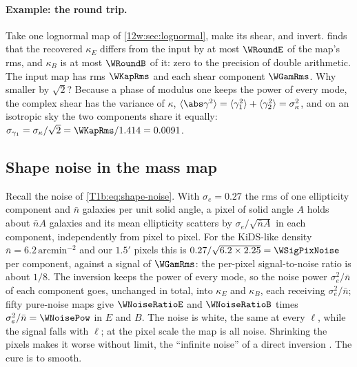 \paragraph{Example: the round trip.} Take one lognormal map of \cref{12w:sec:lognormal}, make its shear, and
invert.  finds that the recovered $\kappa_E$ differs from the input by at most $\WRoundE$ of the
map's rms, and $\kappa_B$ is at most $\WRoundB$ of it: zero to the precision of double arithmetic. The input map has
rms $\WKapRms$ and each shear component $\WGamRms$. Why smaller by $\sqrt2$? Because a phase of modulus one keeps
the power of every mode, the complex shear has the variance of $\kappa$, $\langle\abs\gamma^2\rangle=\langle
\gamma_1^2\rangle+\langle\gamma_2^2\rangle=\sigma_\kappa^2$, and on an isotropic sky the two components share it
equally: $\sigma_{\gamma_1}=\sigma_\kappa/\sqrt2=\WKapRms/1.414=0.0091$.

\subsection{Shape noise in the mass map}
\label{12w:sec:ks-noise}

Recall the noise of \eqref{T1b:eq:shape-noise}. With $\sigma_e=0.27$ the rms of one ellipticity component and
$\bar n$ galaxies per unit solid angle, a pixel of solid angle $A$ holds about $\bar nA$ galaxies and its mean
ellipticity scatters by $\sigma_e/\sqrt{\bar nA}$ in each component, independently from pixel to pixel. For the
KiDS-like density $\bar n=6.2\,\mathrm{arcmin}^{-2}$ and our $1.5'$ pixels this is
$0.27/\sqrt{6.2\times2.25}=\WSigPixNoise$ per component, against a signal of $\WGamRms$: the per-pixel
signal-to-noise ratio is about $1/8$. The inversion keeps the power of every mode, so the noise power
$\sigma_e^2/\bar n$ of each component goes, unchanged in total, into $\kappa_E$ and $\kappa_B$, each receiving
$\sigma_e^2/\bar n$; fifty pure-noise maps give $\WNoiseRatioE$ and $\WNoiseRatioB$ times $\sigma_e^2/\bar n=
\WNoisePow$ in $E$ and $B$. The noise is white, the same at every $\ell$, while the signal falls with $\ell$; at
the pixel scale the map is all noise. Shrinking the pixels makes it worse without limit, the ``infinite noise'' of
a direct inversion . The cure is to smooth.

